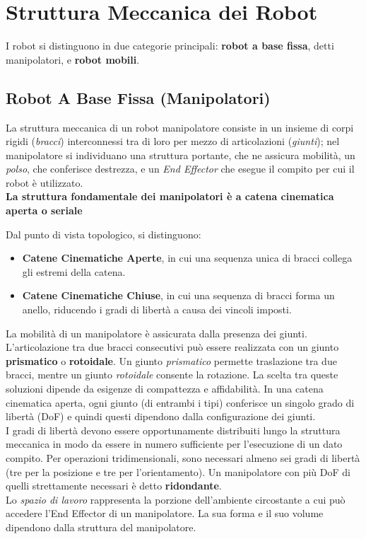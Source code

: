 \documentclass[11pt, a4paper]{report}
\begin{document}
\section{Struttura Meccanica dei Robot}
I robot si distinguono in due categorie principali: \textbf{robot a base fissa}, detti manipolatori, e \textbf{robot mobili}.

\subsection{Robot A Base Fissa (Manipolatori)}
La struttura meccanica di un robot manipolatore consiste in un insieme di corpi rigidi (\textit{bracci}) interconnessi tra di loro per mezzo di articolazioni (\textit{giunti}); nel manipolatore si individuano una struttura portante, che ne assicura mobilità, un
\textit{polso}, che conferisce destrezza, e un \textit{End Effector} che esegue il compito per cui il robot è utilizzato.\\
\textbf{La struttura fondamentale dei manipolatori è a catena cinematica aperta o seriale}

Dal punto di vista topologico, si distinguono:
\begin{itemize}
	\item \textbf{Catene Cinematiche Aperte}, in cui una sequenza unica di bracci collega gli estremi della catena.
	\item \textbf{Catene Cinematiche Chiuse}, in cui una sequenza di bracci forma un anello, riducendo i gradi di libertà a causa dei vincoli imposti.
\end{itemize}
La mobilità di un manipolatore è assicurata dalla presenza dei giunti. L'articolazione tra due bracci consecutivi può essere realizzata con un giunto \textbf{prismatico} o \textbf{rotoidale}. Un giunto \textit{prismatico} permette traslazione tra due bracci, mentre un giunto \textit{rotoidale} consente la rotazione. La scelta tra queste soluzioni dipende da esigenze di compattezza e affidabilità.
In una catena cinematica aperta, ogni giunto (di entrambi i tipi) conferisce un singolo grado di libertà (DoF) e quindi questi dipendono dalla configurazione dei giunti.\\
I gradi di libertà devono essere opportunamente distribuiti lungo la struttura
meccanica in modo da essere in numero sufficiente per l'esecuzione di un dato
compito. Per operazioni tridimensionali, sono necessari almeno sei gradi di libertà (tre per la posizione e tre per l'orientamento). Un manipolatore con più DoF di quelli strettamente necessari è detto \textbf{ridondante}.\\
Lo \textit{spazio di lavoro} rappresenta la porzione dell'ambiente circostante a cui
può accedere l'End Effector di un manipolatore. La sua forma e il suo volume
dipendono dalla struttura del manipolatore.
\newpage
\end{document}
